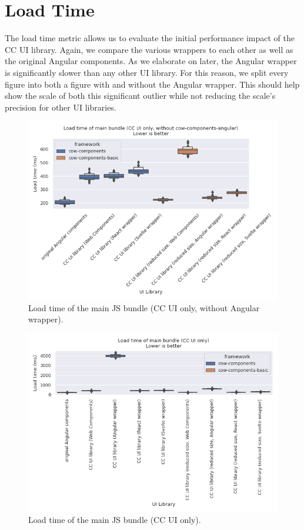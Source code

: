 \section{Load Time}
The load time metric allows us to evaluate the initial performance impact of the CC UI library. Again, we compare the various wrappers to each other as well as the original Angular components. As we elaborate on later, the Angular wrapper is significantly slower than any other UI library. For this reason, we split every figure into both a figure with and without the Angular wrapper. This should help show the scale of both this significant outlier while not reducing the scale's precision for other UI libraries.

\begin{figure}[htbp]
  \includegraphics[width=\columnwidth]{plots/load-time-cow-no-angular.png}
  \caption{Load time of the main JS bundle (CC UI only, without Angular wrapper).}
  \label{fig:results:load-time-cow-no-angular}
  \centering
\end{figure}

\begin{figure}[htbp]
  \includegraphics[width=\columnwidth]{plots/load-time-cow.png}
  \caption{Load time of the main JS bundle (CC UI only).}
  \label{fig:results:load-time-cow}
  \centering
\end{figure}

